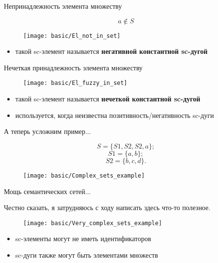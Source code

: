\begin{frame}{Непринадлежность элемента множеству}
  \begin{center}
    \[ a \notin S \]

    \objeqv  

    \begin{figure}
      \texttt{[image: basic/El\_not\_in\_set]}
    \end{figure}
  \end{center}

  \begin{itemize}
  \item такой sc-элемент называется \textbf{негативной константной sc-дугой}
  \end{itemize}
\end{frame}

\begin{frame}{Нечеткая принадлежность элемента множеству}
  \begin{figure}
    \centering
    \texttt{[image: basic/El\_fuzzy\_in\_set]}
  \end{figure}

  \begin{itemize}
  \item такой sc-элемент называется \textbf{нечеткой константной sc-дугой}
  \item используется, когда неизвестна позитивность/негативность sc-дуги
  \end{itemize}
\end{frame}

\begin{frame}{А теперь усложним пример...}
  \begin{center}
    \[ S = \{S1, S2, S2, a\}; \]
    \[ S1 = \{a, b\}; \]
    \[ S2 = \{b, c, d\}. \]
  \end{center}

  \objeqv

  \begin{figure}
    \texttt{[image: basic/Complex\_sets\_example]}
  \end{figure}
\end{frame}

\begin{frame}{Мощь семантических сетей...}
  \begin{center}
    Честно сказать, я затрудняюсь с ходу написать здесь что-то
    полезное.
  \end{center}

  \objeqv  

  \begin{figure}
    \centering
    \texttt{[image: basic/Very\_complex\_sets\_example]}
  \end{figure}

  \begin{itemize}
  \item sc-элементы могут не иметь идентификаторов
  \item sc-дуги также могут быть элементами множеств
  \end{itemize}
\end{frame}

